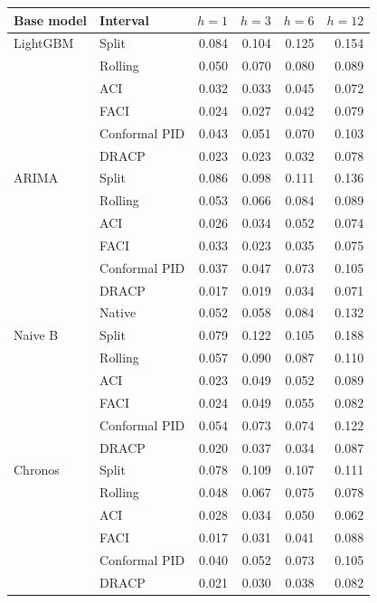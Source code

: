 \begin{tabular}{llrrrr}
\toprule
Base model & Interval & $h{=}1$ & $h{=}3$ & $h{=}6$ & $h{=}12$ \\
\midrule
LightGBM & Split & 0.084 & 0.104 & 0.125 & 0.154 \\
 & Rolling & 0.050 & 0.070 & 0.080 & 0.089 \\
 & ACI & 0.032 & 0.033 & 0.045 & 0.072 \\
 & FACI & 0.024 & 0.027 & 0.042 & 0.079 \\
 & Conformal PID & 0.043 & 0.051 & 0.070 & 0.103 \\
 & DRACP & 0.023 & 0.023 & 0.032 & 0.078 \\
\midrule
ARIMA & Split & 0.086 & 0.098 & 0.111 & 0.136 \\
 & Rolling & 0.053 & 0.066 & 0.084 & 0.089 \\
 & ACI & 0.026 & 0.034 & 0.052 & 0.074 \\
 & FACI & 0.033 & 0.023 & 0.035 & 0.075 \\
 & Conformal PID & 0.037 & 0.047 & 0.073 & 0.105 \\
 & DRACP & 0.017 & 0.019 & 0.034 & 0.071 \\
 & Native & 0.052 & 0.058 & 0.084 & 0.132 \\
\midrule
Naive B & Split & 0.079 & 0.122 & 0.105 & 0.188 \\
 & Rolling & 0.057 & 0.090 & 0.087 & 0.110 \\
 & ACI & 0.023 & 0.049 & 0.052 & 0.089 \\
 & FACI & 0.024 & 0.049 & 0.055 & 0.082 \\
 & Conformal PID & 0.054 & 0.073 & 0.074 & 0.122 \\
 & DRACP & 0.020 & 0.037 & 0.034 & 0.087 \\
\midrule
Chronos & Split & 0.078 & 0.109 & 0.107 & 0.111 \\
 & Rolling & 0.048 & 0.067 & 0.075 & 0.078 \\
 & ACI & 0.028 & 0.034 & 0.050 & 0.062 \\
 & FACI & 0.017 & 0.031 & 0.041 & 0.088 \\
 & Conformal PID & 0.040 & 0.052 & 0.073 & 0.105 \\
 & DRACP & 0.021 & 0.030 & 0.038 & 0.082 \\
\bottomrule
\end{tabular}
